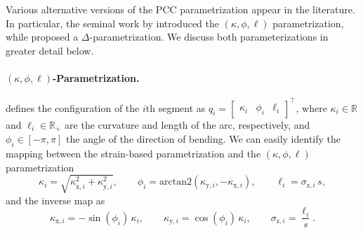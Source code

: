 Various alternative versions of the \gls{PCC} parametrization appear in the literature. In particular, the seminal work by \citet{webster2010design} introduced the $(\kappa,\phi,\ell)$ parametrization, while \citet{della2020improved} proposed a $\Delta$-parametrization. We discuss both parameterizations in greater detail below.

\paragraph{$(\kappa,\phi,\ell)$-Parametrization.}
\citet{webster2010design} defines the configuration of the $i$th segment as $q_i = \begin{bmatrix}
    \kappa_i & \phi_i & \ell_i
\end{bmatrix}^\top$, where $\kappa_i \in \mathbb{R}$ and $\ell_i \in \mathbb{R}_+$ are the curvature and length of the arc, respectively, and $\phi_i \in [-\pi,\pi]$ the angle of the direction of bending.
We can easily identify the mapping between the strain-based parametrization and the $(\kappa,\phi,\ell)$ parametrization
\begin{equation}
    \kappa_i = \sqrt{\kappa_{\mathrm{x},i}^2 + \kappa_{\mathrm{y},i}^2},
    \qquad
    \phi_i = \mathrm{arctan2}(\kappa_{\mathrm{y},i}, -\kappa_{\mathrm{x},i}),
    \qquad
    \ell_i = \sigma_{\mathrm{z},i} \, s,
\end{equation}
and the inverse map as
\begin{equation}
    \kappa_{\mathrm{x},i} = -\sin(\phi_i) \, \kappa_i,
    \qquad
    \kappa_{\mathrm{y},i} = \cos(\phi_i) \, \kappa_i,
    \qquad
    \sigma_{\mathrm{z},i} = \frac{\ell_i}{s}.
\end{equation}
